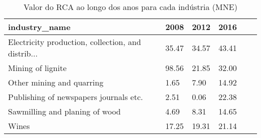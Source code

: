 \begin{table}
\centering
\caption{Valor do RCA ao longo dos anos para cada indústria (MNE)}
\begin{tabular}{p{6cm}p{1.5cm}p{1.5cm}p{1.5cm}p{1.5cm}p{1.5cm}}
\toprule
                                     industry\_name &  2008 &  2012 &  2016 \\
\midrule
Electricity production, collection, and distrib... & 35.47 & 34.57 & 43.41 \\
                                 Mining of lignite & 98.56 & 21.85 & 32.00 \\
                         Other mining and quarring &  1.65 &  7.90 & 14.92 \\
            Publishing of newspapers journals etc. &  2.51 &  0.06 & 22.38 \\
                    Sawmilling and planing of wood &  4.69 &  8.31 & 14.65 \\
                                             Wines & 17.25 & 19.31 & 21.14 \\
\bottomrule
\end{tabular}
\end{table}
